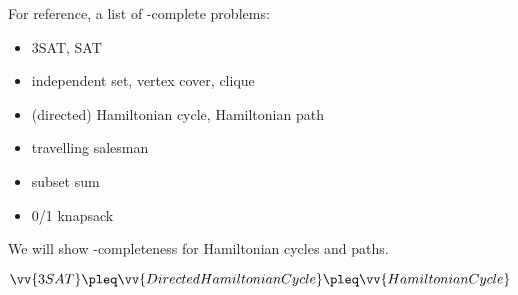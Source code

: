 For reference, a list of \NP-complete problems:
\begin{itemize}[nosep]
  \item 3SAT, SAT
  \item independent set, vertex cover, clique
  \item (directed) Hamiltonian cycle, Hamiltonian path
  \item travelling salesman
  \item subset sum
  \item 0/1 knapsack
\end{itemize}

We will show \NP-completeness for Hamiltonian cycles and paths.

\begin{theorem}
  $\vv{3SAT} \pleq \vv{DirectedHamiltonianCycle} \pleq \vv{HamiltonianCycle}$
\end{theorem}
